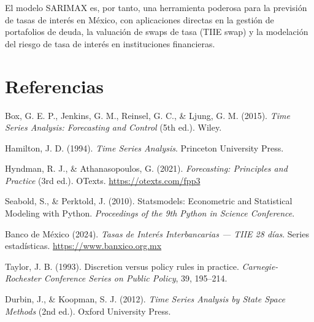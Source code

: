 \documentclass[12pt, letterpaper]{article}
\begin{document}
El modelo SARIMAX es, por tanto, una herramienta poderosa para la previsión de tasas de interés en México, con aplicaciones directas en la gestión de portafolios de deuda, la valuación de swaps de tasa (TIIE swap) y la modelación del riesgo de tasa de interés en instituciones financieras.

\newpage
\section*{Referencias}

\begin{enumerate}[leftmargin=2cm, label={[\arabic*]}]
  \item Box, G. E. P., Jenkins, G. M., Reinsel, G. C., \& Ljung, G. M. (2015). \textit{Time Series Analysis: Forecasting and Control} (5th ed.). Wiley.

  \item Hamilton, J. D. (1994). \textit{Time Series Analysis}. Princeton University Press.

  \item Hyndman, R. J., \& Athanasopoulos, G. (2021). \textit{Forecasting: Principles and Practice} (3rd ed.). OTexts. \url{https://otexts.com/fpp3}

  \item Seabold, S., \& Perktold, J. (2010). Statsmodels: Econometric and Statistical Modeling with Python. \textit{Proceedings of the 9th Python in Science Conference}.

  \item Banco de México (2024). \textit{Tasas de Interés Interbancarias — TIIE 28 días}. Series estadísticas. \url{https://www.banxico.org.mx}

  \item Taylor, J. B. (1993). Discretion versus policy rules in practice. \textit{Carnegie-Rochester Conference Series on Public Policy}, 39, 195--214.

  \item Durbin, J., \& Koopman, S. J. (2012). \textit{Time Series Analysis by State Space Methods} (2nd ed.). Oxford University Press.
\end{enumerate}
\end{document}
